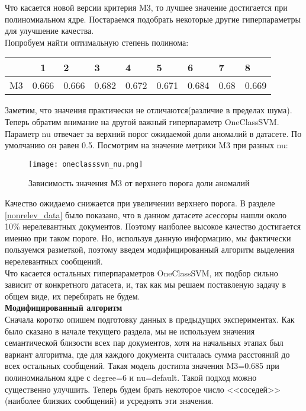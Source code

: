 \documentclass{article}
\begin{document}
 Что касается новой версии критерия M3, то лучшее значение достигается при полиномиальном ядре. Постараемся подобрать некоторые другие гиперпараметры для улучшение качества.\\

 Попробуем найти оптимальную степень полинома:
\begin{table}[!htb]
    \center
    \begin{tabular}{|l|l|l|l|l|l|l|l|l|}
    \hline
    \multicolumn{1}{|c|}{} & \multicolumn{1}{c|}{1} & 2     & 3     & 4     & 5     & 6     & 7    & 8     \\ \hline
    M3                     & 0.666                  & 0.666 & 0.682 & 0.672 & 0.671 & 0.684 & 0.68 & 0.669 \\ \hline
    \end{tabular}
\end{table}

Заметим, что значения практически не отличаются(различие в пределах шума).\\

Теперь обратим внимание на другой важный гиперпараметр OneClassSVM. Параметр nu отвечает за верхний порог ожидаемой доли аномалий в датасете. По умолчанию он равен 0.5. Посмотрим на значение метрики M3 при разных nu:

\begin{figure}[!htb]
    \center
        \texttt{[image: oneclasssvm\_nu.png]}
        \caption{Зависимость значения М3 от верхнего порога доли аномалий}
\end{figure}

Качество ожидаемо снижается при увеличении верхнего порога. В разделе \textcolor{cyan}{\ref{nonrelev_data}} было показано, что в данном датасете асессоры нашли около 10\% нерелевантных документов. Поэтому наиболее высокое качество достигается именно при таком пороге. Но, используя данную информацию, мы фактически пользуемся разметкой, поэтому введем модифицированный алгоритм выделения нерелевантных сообщений.\\

Что касается остальных гиперпараметров OneClassSVM, их подбор сильно зависит от конкретного датасета, и, так как мы решаем поставленую задачу в общем виде, их перебирать не будем.\\

\textbf{Модифицированный алгоритм}\\
Сначала коротко опишем подготовку данных в предыдущих экспериментах. Как было сказано в начале текущего раздела, мы не используем значения семантической близости всех пар документов, хотя на начальных этапах был вариант алгоритма, где для каждого документа считалась сумма расстояний до всех остальных сообщений. Такая модель достигла значения M3=0.685 при полиномиальном ядре с degree=6 и nu=default. Такой подход можно существенно улучшить. Теперь будем брать некоторое число <<соседей>> (наиболее близких сообщений) и усреднять эти значения. \\
\end{document}
